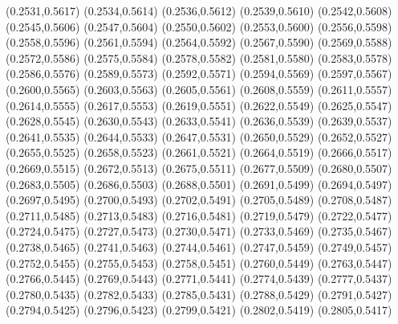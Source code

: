 \PST@Cross(0.2531,0.5617)
\PST@Cross(0.2534,0.5614)
\PST@Cross(0.2536,0.5612)
\PST@Cross(0.2539,0.5610)
\PST@Cross(0.2542,0.5608)
\PST@Cross(0.2545,0.5606)
\PST@Cross(0.2547,0.5604)
\PST@Cross(0.2550,0.5602)
\PST@Cross(0.2553,0.5600)
\PST@Cross(0.2556,0.5598)
\PST@Cross(0.2558,0.5596)
\PST@Cross(0.2561,0.5594)
\PST@Cross(0.2564,0.5592)
\PST@Cross(0.2567,0.5590)
\PST@Cross(0.2569,0.5588)
\PST@Cross(0.2572,0.5586)
\PST@Cross(0.2575,0.5584)
\PST@Cross(0.2578,0.5582)
\PST@Cross(0.2581,0.5580)
\PST@Cross(0.2583,0.5578)
\PST@Cross(0.2586,0.5576)
\PST@Cross(0.2589,0.5573)
\PST@Cross(0.2592,0.5571)
\PST@Cross(0.2594,0.5569)
\PST@Cross(0.2597,0.5567)
\PST@Cross(0.2600,0.5565)
\PST@Cross(0.2603,0.5563)
\PST@Cross(0.2605,0.5561)
\PST@Cross(0.2608,0.5559)
\PST@Cross(0.2611,0.5557)
\PST@Cross(0.2614,0.5555)
\PST@Cross(0.2617,0.5553)
\PST@Cross(0.2619,0.5551)
\PST@Cross(0.2622,0.5549)
\PST@Cross(0.2625,0.5547)
\PST@Cross(0.2628,0.5545)
\PST@Cross(0.2630,0.5543)
\PST@Cross(0.2633,0.5541)
\PST@Cross(0.2636,0.5539)
\PST@Cross(0.2639,0.5537)
\PST@Cross(0.2641,0.5535)
\PST@Cross(0.2644,0.5533)
\PST@Cross(0.2647,0.5531)
\PST@Cross(0.2650,0.5529)
\PST@Cross(0.2652,0.5527)
\PST@Cross(0.2655,0.5525)
\PST@Cross(0.2658,0.5523)
\PST@Cross(0.2661,0.5521)
\PST@Cross(0.2664,0.5519)
\PST@Cross(0.2666,0.5517)
\PST@Cross(0.2669,0.5515)
\PST@Cross(0.2672,0.5513)
\PST@Cross(0.2675,0.5511)
\PST@Cross(0.2677,0.5509)
\PST@Cross(0.2680,0.5507)
\PST@Cross(0.2683,0.5505)
\PST@Cross(0.2686,0.5503)
\PST@Cross(0.2688,0.5501)
\PST@Cross(0.2691,0.5499)
\PST@Cross(0.2694,0.5497)
\PST@Cross(0.2697,0.5495)
\PST@Cross(0.2700,0.5493)
\PST@Cross(0.2702,0.5491)
\PST@Cross(0.2705,0.5489)
\PST@Cross(0.2708,0.5487)
\PST@Cross(0.2711,0.5485)
\PST@Cross(0.2713,0.5483)
\PST@Cross(0.2716,0.5481)
\PST@Cross(0.2719,0.5479)
\PST@Cross(0.2722,0.5477)
\PST@Cross(0.2724,0.5475)
\PST@Cross(0.2727,0.5473)
\PST@Cross(0.2730,0.5471)
\PST@Cross(0.2733,0.5469)
\PST@Cross(0.2735,0.5467)
\PST@Cross(0.2738,0.5465)
\PST@Cross(0.2741,0.5463)
\PST@Cross(0.2744,0.5461)
\PST@Cross(0.2747,0.5459)
\PST@Cross(0.2749,0.5457)
\PST@Cross(0.2752,0.5455)
\PST@Cross(0.2755,0.5453)
\PST@Cross(0.2758,0.5451)
\PST@Cross(0.2760,0.5449)
\PST@Cross(0.2763,0.5447)
\PST@Cross(0.2766,0.5445)
\PST@Cross(0.2769,0.5443)
\PST@Cross(0.2771,0.5441)
\PST@Cross(0.2774,0.5439)
\PST@Cross(0.2777,0.5437)
\PST@Cross(0.2780,0.5435)
\PST@Cross(0.2782,0.5433)
\PST@Cross(0.2785,0.5431)
\PST@Cross(0.2788,0.5429)
\PST@Cross(0.2791,0.5427)
\PST@Cross(0.2794,0.5425)
\PST@Cross(0.2796,0.5423)
\PST@Cross(0.2799,0.5421)
\PST@Cross(0.2802,0.5419)
\PST@Cross(0.2805,0.5417)
